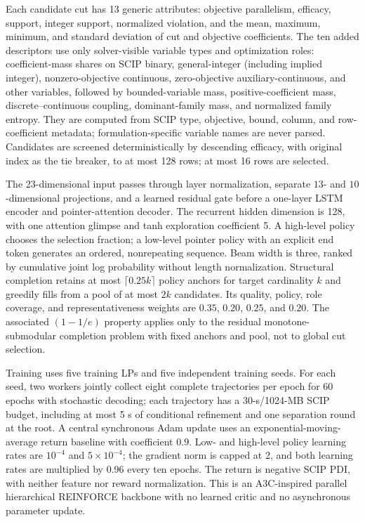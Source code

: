 \documentclass[11pt]{article}
\begin{document}
Each candidate cut has 13 generic attributes: objective parallelism, efficacy,
support, integer support, normalized violation, and the mean, maximum, minimum,
and standard deviation of cut and objective coefficients. The ten added
descriptors use only solver-visible variable types and optimization roles:
coefficient-mass shares on SCIP binary, general-integer (including implied
integer), nonzero-objective continuous, zero-objective auxiliary-continuous,
and other variables, followed by bounded-variable mass, positive-coefficient
mass, discrete--continuous coupling, dominant-family mass, and normalized
family entropy. They are computed from SCIP type, objective, bound, column, and
row-coefficient metadata; formulation-specific variable names are never
parsed. Candidates are screened deterministically by descending efficacy,
with original index as the tie breaker, to at most 128 rows; at most 16 rows
are selected.

The 23-dimensional input passes through layer normalization, separate
$13$- and $10$-dimensional projections, and a learned residual gate before a
one-layer LSTM encoder and pointer-attention decoder. The recurrent hidden
dimension is 128, with one attention glimpse and tanh exploration coefficient
5. A high-level policy chooses the selection fraction; a low-level pointer
policy with an explicit end token generates an ordered, nonrepeating sequence.
Beam width is three, ranked by cumulative joint log probability without length
normalization. Structural completion retains at most
$\lceil0.25k\rceil$ policy anchors for target cardinality $k$ and greedily
fills from a pool of at most $2k$ candidates. Its quality, policy, role
coverage, and representativeness weights are $0.35$, $0.20$, $0.25$, and
$0.20$. The associated $(1-1/e)$ property applies only to the residual
monotone-submodular completion problem with fixed anchors and pool, not to
global cut selection.

Training uses five training LPs and five independent training seeds. For each
seed, two workers jointly collect eight complete trajectories per epoch for 60
epochs with stochastic decoding; each trajectory has a 30-s/1024-MB SCIP
budget, including at most 5 s of conditional refinement and one separation
round at the root. A central synchronous Adam update uses an
exponential-moving-average return baseline with coefficient $0.9$. Low- and
high-level policy learning rates are $10^{-4}$ and $5\times10^{-4}$; the
gradient norm is capped at 2, and both learning rates are multiplied by 0.96
every ten epochs. The return is negative SCIP PDI, with neither feature nor
reward normalization. This is an A3C-inspired parallel hierarchical REINFORCE
backbone with no learned critic and no asynchronous parameter update.
\end{document}
